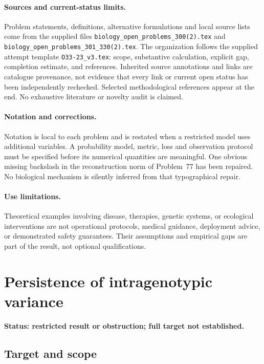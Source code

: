 \documentclass[11pt]{article}
\begin{document}
\paragraph{Sources and current-status limits.}
Problem statements, definitions, alternative formulations and local source lists
come from the supplied files
\texttt{biology\_open\_problems\_300(2).tex} and
\texttt{biology\_open\_problems\_301\_330(2).tex}.
The organization follows the supplied attempt template
\texttt{O33-23\_v3.tex}: scope, substantive calculation, explicit gap,
completion estimate, and references. Inherited source annotations and links are
catalogue provenance, not evidence that every link or current open status has
been independently rechecked. Selected methodological references appear at the
end. No exhaustive literature or novelty audit is claimed.

\paragraph{Notation and corrections.}
Notation is local to each problem and is restated when a restricted model uses
additional variables. A probability model, metric, loss and observation protocol
must be specified before its numerical quantities are meaningful. One obvious
missing backslash in the reconstruction norm of Problem~77 has been repaired.
No biological mechanism is silently inferred from that typographical repair.

\paragraph{Use limitations.}
Theoretical examples involving disease, therapies, genetic systems, or ecological
interventions are not operational protocols, medical guidance, deployment advice,
or demonstrated safety guarantees. Their assumptions and empirical gaps are part
of the result, not optional qualifications.


\section*{Persistence of intragenotypic variance}
\label{prob:184}
\noindent\textbf{Status: restricted result or obstruction; full target not established.}
\subsection{Target and scope}
\end{document}

